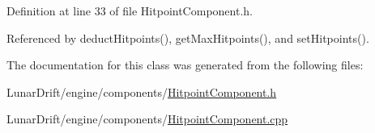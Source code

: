 Definition at line 33 of file Hitpoint\+Component.\+h.



Referenced by deduct\+Hitpoints(), get\+Max\+Hitpoints(), and set\+Hitpoints().



The documentation for this class was generated from the following files\+:\begin{DoxyCompactItemize}
\item 
Lunar\+Drift/engine/components/\hyperlink{_hitpoint_component_8h}{Hitpoint\+Component.\+h}\item 
Lunar\+Drift/engine/components/\hyperlink{_hitpoint_component_8cpp}{Hitpoint\+Component.\+cpp}\end{DoxyCompactItemize}
